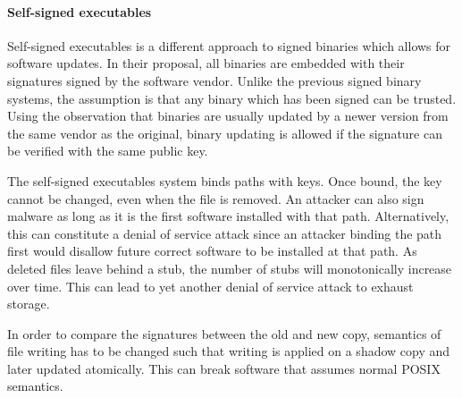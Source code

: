 \paragraph{Self-signed executables}

Self-signed executables \cite{wurster2007self} is a different approach
to signed binaries which allows for software updates.
In their proposal, all binaries are embedded with their signatures signed
by the software vendor.
Unlike the previous signed binary systems, the assumption is that any
binary which has been signed can be trusted.
Using the observation that binaries are usually updated by a newer
version from the same vendor as the original,
binary updating is allowed if the signature can be verified
with the same public key.

The self-signed executables system binds paths with keys.
Once bound, the key cannot be changed, even when the file is removed.
An attacker can also sign malware as long as it is the first
software installed with that path.
Alternatively, this can constitute a denial of service attack since
an attacker binding the path first would disallow future correct
software to be installed at that path.
As deleted files leave behind a stub, the number of stubs will
monotonically increase over time. This can lead to yet another
denial of service attack to exhaust storage.

In order to compare the signatures between the old and new copy,
semantics of file writing has to be changed such that
writing is applied on a shadow copy and later updated atomically.
This can break software that assumes normal POSIX semantics.
